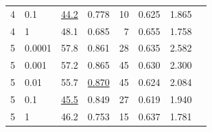 \documentclass[12pt]{jarticle}
\numberwithin{equation}{section}    %
\numberwithin{figure}{section}      %
\numberwithin{table}{section}      %
\begin{document}
\begin{table}[bt]
\begin{center}
{\begin{tabular}{|c|l|rrrrrr|}
                4                        & 0.1                                      & \underline{44.2}             & 0.778                     & 10                         & 0.625                         & 1.865                             &                                    \\
                4                        & 1                                        & 48.1                         & 0.685                     & 7                          & 0.655                         & 1.758                             &                                    \\
                \hline
                5                        & 0.0001                                   & 57.8                         & 0.861                     & 28                         & 0.635                         & 2.582                             &                                    \\
                5                        & 0.001                                    & 57.2                         & 0.865                     & 45                         & 0.630                         & 2.300                             &                                    \\
                5                        & 0.01                                     & 55.7                         & \underline{0.870}         & 45                         & 0.624                         & 2.084                             &                                    \\
                5                        & 0.1                                      & \underline{45.5}             & 0.849                     & 27                         & 0.619                         & 1.940                             &                                    \\
                5                        & 1                                        & 46.2                         & 0.753                     & 15                         & 0.637                         & 1.781                             &                                    \\
                \hline
            \end{tabular}
        }
    \end{center}
\end{table}
\end{document}
